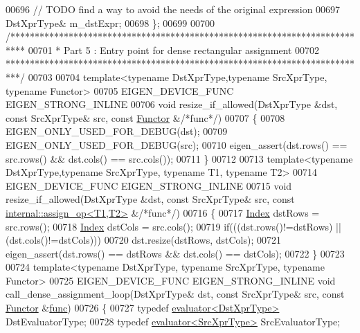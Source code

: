 \begin{DoxyCode}
00696   \textcolor{comment}{// TODO find a way to avoid the needs of the original expression}
00697   DstXprType& m\_dstExpr;
00698 \};
00699 
00700 \textcolor{comment}{/***************************************************************************}
00701 \textcolor{comment}{* Part 5 : Entry point for dense rectangular assignment}
00702 \textcolor{comment}{***************************************************************************/}
00703 
00704 \textcolor{keyword}{template}<\textcolor{keyword}{typename} DstXprType,\textcolor{keyword}{typename} SrcXprType, \textcolor{keyword}{typename} Functor>
00705 EIGEN\_DEVICE\_FUNC EIGEN\_STRONG\_INLINE
00706 \textcolor{keywordtype}{void} resize\_if\_allowed(DstXprType &dst, \textcolor{keyword}{const} SrcXprType& src, \textcolor{keyword}{const} \hyperlink{struct_functor}{Functor} &\textcolor{comment}{/*func*/})
00707 \{
00708   EIGEN\_ONLY\_USED\_FOR\_DEBUG(dst);
00709   EIGEN\_ONLY\_USED\_FOR\_DEBUG(src);
00710   eigen\_assert(dst.rows() == src.rows() && dst.cols() == src.cols());
00711 \}
00712 
00713 \textcolor{keyword}{template}<\textcolor{keyword}{typename} DstXprType,\textcolor{keyword}{typename} SrcXprType, \textcolor{keyword}{typename} T1, \textcolor{keyword}{typename} T2>
00714 EIGEN\_DEVICE\_FUNC EIGEN\_STRONG\_INLINE
00715 \textcolor{keywordtype}{void} resize\_if\_allowed(DstXprType &dst, \textcolor{keyword}{const} SrcXprType& src, \textcolor{keyword}{const} 
      \hyperlink{struct_eigen_1_1internal_1_1assign__op}{internal::assign\_op<T1,T2>} &\textcolor{comment}{/*func*/})
00716 \{
00717   \hyperlink{namespace_eigen_a62e77e0933482dafde8fe197d9a2cfde}{Index} dstRows = src.rows();
00718   \hyperlink{namespace_eigen_a62e77e0933482dafde8fe197d9a2cfde}{Index} dstCols = src.cols();
00719   \textcolor{keywordflow}{if}(((dst.rows()!=dstRows) || (dst.cols()!=dstCols)))
00720     dst.resize(dstRows, dstCols);
00721   eigen\_assert(dst.rows() == dstRows && dst.cols() == dstCols);
00722 \}
00723 
00724 \textcolor{keyword}{template}<\textcolor{keyword}{typename} DstXprType, \textcolor{keyword}{typename} SrcXprType, \textcolor{keyword}{typename} Functor>
00725 EIGEN\_DEVICE\_FUNC EIGEN\_STRONG\_INLINE \textcolor{keywordtype}{void} call\_dense\_assignment\_loop(DstXprType& dst, \textcolor{keyword}{const} SrcXprType& 
      src, \textcolor{keyword}{const} \hyperlink{struct_functor}{Functor} &\hyperlink{structfunc}{func})
00726 \{
00727   \textcolor{keyword}{typedef} \hyperlink{struct_eigen_1_1internal_1_1evaluator}{evaluator<DstXprType>} DstEvaluatorType;
00728   \textcolor{keyword}{typedef} \hyperlink{struct_eigen_1_1internal_1_1evaluator}{evaluator<SrcXprType>} SrcEvaluatorType;

\end{DoxyCode}
